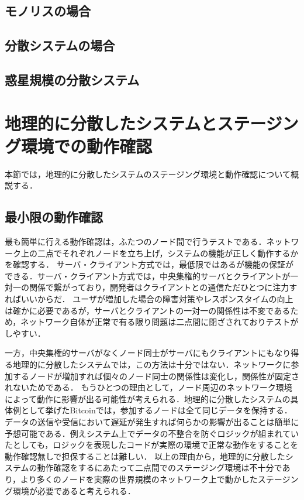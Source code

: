 \subsection{モノリスの場合}

\subsection{分散システムの場合}

\subsection{惑星規模の分散システム}

\section{地理的に分散したシステムとステージング環境での動作確認}
\label{background:staging-environment}
本節では，地理的に分散したシステムのステージング環境と動作確認について概説する．

\subsection{最小限の動作確認}
最も簡単に行える動作確認は，ふたつのノード間で行うテストである．ネットワーク上の二点でそれぞれノードを立ち上げ，システムの機能が正しく動作するかを確認する．
サーバ・クライアント方式では，最低限ではあるが機能の保証ができる．サーバ・クライアント方式では，中央集権的サーバとクライアントが一対一の関係で繋がっており，開発者はクライアントとの通信ただひとつに注力すればいいからだ．
ユーザが増加した場合の障害対策やレスポンスタイムの向上は確かに必要であるが，サーバとクライアントの一対一の関係性は不変であるため，ネットワーク自体が正常で有る限り問題は二点間に閉ざされておりテストがしやすい．

一方，中央集権的サーバがなくノード同士がサーバにもクライアントにもなり得る地理的に分散したシステムでは，この方法は十分ではない．ネットワークに参加するノードが増加すれば個々のノード同士の関係性は変化し，関係性が固定されないためである．
もうひとつの理由として，ノード周辺のネットワーク環境によって動作に影響が出る可能性が考えられる．地理的に分散したシステムの具体例として挙げたBitcoinでは，参加するノードは全て同じデータを保持する．
データの送信や受信において遅延が発生すれば何らかの影響が出ることは簡単に予想可能である．例えシステム上でデータの不整合を防ぐロジックが組まれていたとしても，ロジックを表現したコードが実際の環境で正常な動作をすることを動作確認無しで担保することは難しい．
以上の理由から，地理的に分散したシステムの動作確認をするにあたって二点間でのステージング環境は不十分であり，より多くのノードを実際の世界規模のネットワーク上で動かしたステージング環境が必要であると考えられる．

